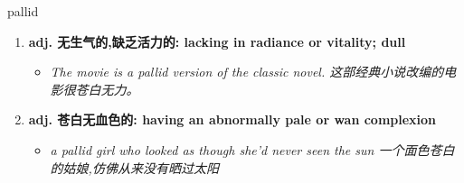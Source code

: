 
\begin{frame}
{\huge pallid}
\begin{center}
\begin{enumerate}\Large
  \item \textbf{adj. 无生气的,缺乏活力的: lacking in radiance or vitality; dull}
  \begin{itemize}
    \item \em{\Large{The movie is a pallid version of the classic novel. 这部经典小说改编的电影很苍白无力。}}
  \end{itemize}
  \item \textbf{adj. 苍白无血色的: having an abnormally pale or wan complexion}
  \begin{itemize}
    \item \em{\Large{a pallid girl who looked as though she'd never seen the sun 一个面色苍白的姑娘,仿佛从来没有晒过太阳}}
  \end{itemize}
\end{enumerate}
\end{center}
\end{frame}
